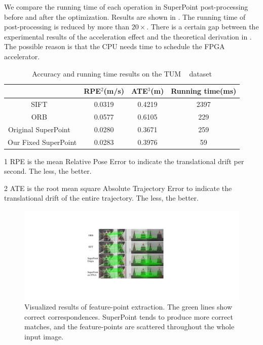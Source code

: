We compare the running time of each operation in SuperPoint post-processing before and after the optimization. Results are shown in . The running time of post-processing is reduced by more than $20\times$. There is a certain gap between the experimental results of the acceleration effect and the theoretical derivation in . The possible reason is that the CPU needs time to schedule the FPGA accelerator.

\begin{table}[t]
  \centering
  \caption{ Accuracy and running time results on the TUM ~\cite{sturm12iros} dataset  }
  \footnotesize
  \begin{threeparttable}
\begin{tabular}{|c|c|c|c|} 
  \hline
        & RPE$^2$(m/s) & ATE$^3$(m)  & Running time(ms) \bigstrut\\
  \hline
  SIFT  ~\cite{Lowe-478}  & 0.0319  & 0.4219 & 2397  \bigstrut\\
  \hline
  ORB  ~\cite{Mur-Artal:2017281}  & 0.0577  & 0.6105 & 229  \bigstrut\\
  \hline
  Original SuperPoint  ~\cite{detone2018superpoint} & 0.0280  & 0.3671 & 259  \bigstrut\\
  \hline
  Our Fixed SuperPoint  & 0.0283  & 0.3976 & 59  \bigstrut\\
  \hline
  \end{tabular}%
  

\begin{tablenotes}
  \scriptsize
  \item[1] RPE is the mean Relative Pose Error to indicate the translational drift per second. The less, the better.
  \item[2] ATE is the root mean square Absolute Trajectory Error to indicate the translational drift of the entire trajectory. The less, the better.
\end{tablenotes}
    \end{threeparttable}
  \label{tab:VO}%
\end{table}%


\begin{figure}[t]
  \centering  
  \includegraphics[width=0.99\linewidth]{fig/visual.pdf}
  \vspace{-5mm}
  \caption{Visualized results of feature-point extraction. The green lines show correct correspondences. SuperPoint tends to produce more correct matches, and the feature-points are scattered throughout the whole input image. }
  \label{fig:dputorch}
\end{figure}


